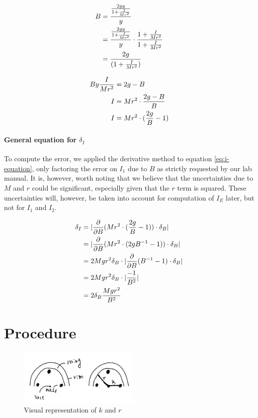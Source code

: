\documentclass[coverpage]{article}
\begin{document}
	\begin{align}
		B &= \frac{\frac{2gy}{1 + \frac{I}{Mr^2}}}{y} \notag \\
		&= \frac{\frac{2gy}{1 + \frac{I}{Mr^2}}}{y} \cdot \frac{1 + \frac{I}{Mr^2}}{1 + \frac{I}{Mr^2}} \notag \\
		&= \frac{2g}{(1 + \frac{I}{Mr^2})}
	\end{align}
	
	\begin{align}
		By\frac{I}{Mr^2} &= 2g - B \notag \\
		I &= Mr^2 \cdot \frac{2g - B}{B} \notag \\
		I &= Mr^2 \cdot (\frac{2g}{B} - 1) \label{eq:i-equation}
	\end{align}
	
	\paragraph{General equation for $\delta_I$}
	
	To compute the error, we applied the derivative method to equation \ref{eq:i-equation}, only factoring the error on $I_1$ due to $B$ as strictly requested by our lab manual. It is, however, worth noting that we believe that the uncertainties due to $M$ and $r$ could be significant, especially given that the $r$ term is squared. These uncertainties will, however, be taken into account for computation of $I_E$ later, but not for $I_1$ and $I_2$.
	
	\begin{align}
		\delta_I &= |\frac{\partial}{\partial B} (Mr^2 \cdot (\frac{2g}{B} - 1)) \cdot \delta_B| \notag \\
		&= |\frac{\partial}{\partial B} (Mr^2 \cdot (2g B^{-1} - 1)) \cdot \delta_B \notag| \notag \\
		&= 2 M g r^2 \delta_B \cdot |\frac{\partial}{\partial B} (B^{-1} - 1) \cdot \delta_B \notag| \notag \\
		&= 2 M g r^2 \delta_B \cdot |\frac{-1}{B^2}| \notag \\
		&= 2 \delta_B \frac{M g r^2}{B^2} \label{eq:delta-i-formula}
	\end{align}
	
	\section{Procedure}
	
	\begin{figure}
		\centering
		\caption{Visual representation of $k$ and $r$}
		\includegraphics[width=2.3in]{graphics/rAndK.png}
	\end{figure}
\end{document}
